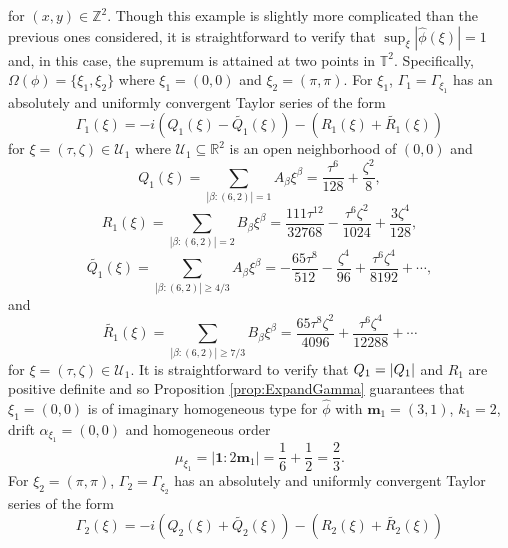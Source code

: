 \documentclass[smallextended]{svjour3}
\theoremstyle{remark}
\newcommand{\f}[2]{\frac{#1}{#2}}
\begin{document}
\begin{example}
\begin{equation*}
\end{equation*}
for $(x,y)\in\mathbb{Z}^2$. Though this example is slightly more complicated than the previous ones considered, it is straightforward to verify that $\sup_{\xi}|\widehat{\phi}(\xi)|=1$ and, in this case, the supremum is attained at two points in $\mathbb{T}^2$. Specifically, $\Omega(\phi)=\{\xi_1,\xi_2\}$ where $\xi_1=(0,0)$ and $\xi_2=(\pi,\pi)$. For $\xi_1$, $\Gamma_1=\Gamma_{\xi_1}$ has an absolutely and uniformly convergent Taylor series of the form
\begin{equation*}
    \Gamma_{1}(\xi)=-i\left(Q_{1}(\xi)-\widetilde{Q_1}(\xi)\right)-\left(R_1(\xi)+\widetilde{R_1}(\xi)\right)
\end{equation*}
for $\xi=(\tau,\zeta)\in\mathcal{U}_1$ where $\mathcal{U}_1\subseteq\mathbb{R}^2$ is an open neighborhood of $(0,0)$ and
\begin{equation*}
    Q_{1}(\xi)=\sum_{|\beta:(6,2)|=1}A_\beta \xi^\beta=\frac{\tau^6}{128}+\frac{\zeta^2}{8},
\end{equation*}
\begin{equation*}
    R_1(\xi)=\sum_{|\beta:(6,2)|=2}B_\beta\xi^\beta=\frac{111\tau^{12}}{32768}-\frac{\tau^6 \zeta^2}{1024}+\frac{3\zeta^4}{128},
\end{equation*}
\begin{equation*}
    \widetilde{Q_1}(\xi)=\sum_{|\beta:(6,2)|\geq 4/3}A_\beta \xi^\beta=-\f{65\tau^8}{512} -\f{\zeta^4}{96} + \frac{\tau^6\zeta^4}{8192} 
    +\cdots,
\end{equation*}
and
\begin{equation*}
    \widetilde{R_1}(\xi)=\sum_{|\beta:(6,2)|\geq 7/3}B_\beta\xi^\beta=\f{65\tau^8\zeta^2}{4096}  + \f{\tau^6 \zeta^4}{12288} + \cdots
\end{equation*}
for $\xi=(\tau,\zeta)\in\mathcal{U}_1$. It is straightforward to verify that $Q_1=\abs{Q_1}$ and $R_1$ are positive definite and so Proposition \ref{prop:ExpandGamma} guarantees that $\xi_1=(0,0)$ is of imaginary homogeneous type for $\widehat{\phi}$ with $\mathbf{m}_1=(3,1)$, $k_1=2$, drift $\alpha_{\xi_1}=(0,0)$ and homogeneous order
\begin{equation*}
    \mu_{\xi_1}=|\mathbf{1}:2\mathbf{m}_1|=\frac{1}{6}+\frac{1}{2}=\frac{2}{3}.
\end{equation*}
For $\xi_2 = (\pi,\pi)$, $\Gamma_2=\Gamma_{\xi_2}$ has an absolutely and uniformly convergent Taylor series of the form
\begin{equation*}
    \Gamma_2(\xi)=-i\left(Q_2(\xi)+\widetilde{Q_2}(\xi)\right)-\left(R_2(\xi)+\widetilde{R_2}(\xi)\right)

\end{equation*}
\end{example}
\end{document}

